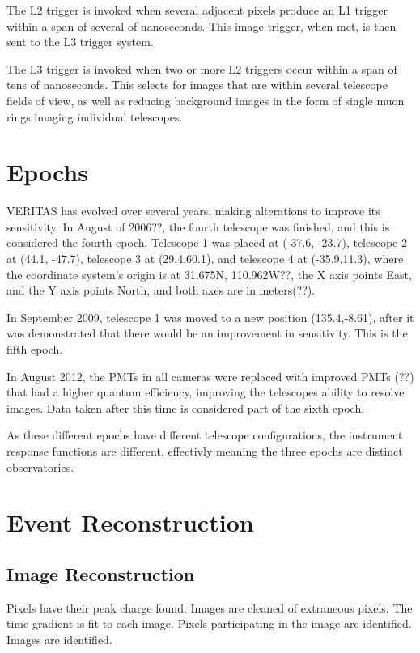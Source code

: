 The L2 trigger is invoked when several adjacent pixels produce an L1 trigger within a span of several of nanoseconds.
This image trigger, when met, is then sent to the L3 trigger system.

The L3 trigger is invoked when two or more L2 triggers occur within a span of tens of nanoseconds.
This selects for images that are within several telescope fields of view, as well as reducing background images in the form of single muon rings imaging individual telescopes.

\section{Epochs}\label{sec:epochs}
VERITAS has evolved over several years, making alterations to improve its sensitivity.
In August of 2006??, the fourth telescope was finished, and this is considered the fourth epoch.
Telescope 1 was placed at (-37.6, -23.7), telescope 2 at (44.1, -47.7), telescope 3 at (29.4,60.1), and telescope 4 at (-35.9,11.3), where the coordinate system's origin is at 31.675N, 110.962W??, the X axis points East, and the Y axis points North, and both axes are in meters(??).

In September 2009, telescope 1 was moved to a new position (135.4,-8.61), after it was demonstrated that there would be an improvement in sensitivity.
This is the fifth epoch.

In August 2012, the PMTs in all cameras were replaced with improved PMTs (??) that had a higher quantum efficiency, improving the telescopes ability to resolve images.
Data taken after this time is considered part of the sixth epoch.

As these different epochs have different telescope configurations, the instrument response functions are different, effectivly meaning the three epochs are distinct observatories.



\section{Event Reconstruction}\label{sec:recon}

\subsection{Image Reconstruction}\label{subsec:imgrecon}
Pixels have their peak charge found.
Images are cleaned of extraneous pixels.
The time gradient is fit to each image.
Pixels participating in the image are identified.
Images are identified.

